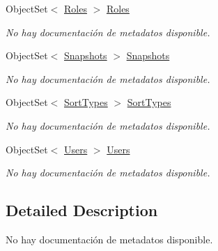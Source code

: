 \begin{DoxyCompactItemize}
Object\-Set$<$ \hyperlink{class_game_memory_1_1_roles}{Roles} $>$ \hyperlink{class_game_memory_1_1_o_m_k_t_d_b_entities_a8e51c314561a34101d9e8c76341e9b81}{Roles}
\begin{DoxyCompactList}\small\item\em No hay documentación de metadatos disponible. \end{DoxyCompactList}\item 
Object\-Set$<$ \hyperlink{class_game_memory_1_1_snapshots}{Snapshots} $>$ \hyperlink{class_game_memory_1_1_o_m_k_t_d_b_entities_a92994523a68924f73a56573bef2c30a1}{Snapshots}
\begin{DoxyCompactList}\small\item\em No hay documentación de metadatos disponible. \end{DoxyCompactList}\item 
Object\-Set$<$ \hyperlink{class_game_memory_1_1_sort_types}{Sort\-Types} $>$ \hyperlink{class_game_memory_1_1_o_m_k_t_d_b_entities_a0492961a574d534922759ef30d8e1ca4}{Sort\-Types}
\begin{DoxyCompactList}\small\item\em No hay documentación de metadatos disponible. \end{DoxyCompactList}\item 
Object\-Set$<$ \hyperlink{class_game_memory_1_1_users}{Users} $>$ \hyperlink{class_game_memory_1_1_o_m_k_t_d_b_entities_a94089f227ee6993ee595a21060f55384}{Users}
\begin{DoxyCompactList}\small\item\em No hay documentación de metadatos disponible. \end{DoxyCompactList}\end{DoxyCompactItemize}


\subsection{Detailed Description}
No hay documentación de metadatos disponible. 




